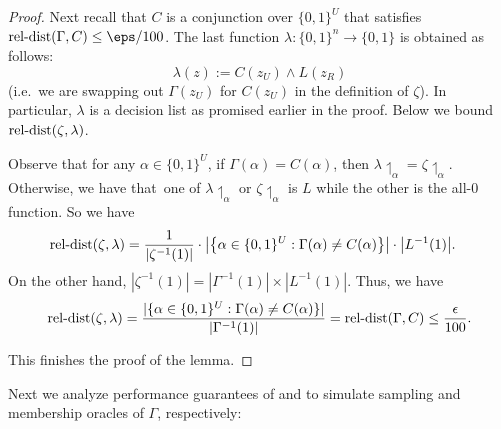 \documentclass[11pt]{article}
\theoremstyle{definition}
\begin{document}
\begin{proof}
Next recall that $C$ is a conjunction over $\{0,1\}^U$ that satisfies
  $\reldist(\Gamma,C)\le \eps/100$.
The last function $\lambda:\{0,1\}^n\rightarrow \{0,1\}$ is obtained  as follows:
    $$\lambda(z):=C(z_U) {\wedge} L(z_R)$$
    (i.e.~we are swapping out $\Gamma(z_U)$ for $C(z_U)$ in the definition of $\zeta$).
    In particular, $\lambda$ is a decision list as promised earlier in the proof.
    Below we bound $\mathrm{rel}\text{-}\mathrm{dist}(\zeta,\lambda)$.

    
    Observe that for any $\alpha \in \{0,1\}^{ U}$, if $\Gamma(\alpha)=C(\alpha)$, then $\lambda{\upharpoonleft_\alpha}=\zeta{\upharpoonleft_\alpha}$. Otherwise, we have that~one of  $\lambda{\upharpoonleft_\alpha}$ or $\zeta{\upharpoonleft_\alpha}$ is $L$ while the other is the all-$0$ function. 
So we have 
    \begin{align*}
        \mathrm{rel}\text{-}\mathrm{dist}(\zeta, \lambda)&=\frac{1}{\left|\zeta^{-1}(1)\right|} \cdot \left|\big\{\alpha\in \{0,1\}^U: \Gamma(\alpha)\ne C(\alpha)\big\}\right|\cdot \big|L^{-1}(1)\big|.
\end{align*}
On the other hand, $ 
         |\zeta^{-1}(1) |
= | \Gamma^{-1}(1) |\times  |L^{-1}(1) |.
    $  
    Thus, we have
    \begin{align*}
          \mathrm{rel}\text{-}\mathrm{dist}(\zeta, \lambda)
= \frac{ | \{\alpha\in \{0,1\}^U: \Gamma(\alpha)\ne C(\alpha) \} |}{|\Gamma^{-1}(1)|}= \mathrm{rel}\text{-}\mathrm{dist}(\Gamma,C)\le \frac{\epsilon}{100}.
    \end{align*}
    
        








































This finishes the proof of the lemma.
\end{proof}




Next we analyze performance guarantees of 
  and  to simulate sampling and membership
  oracles of $\Gamma$, respectively:
\end{document}
